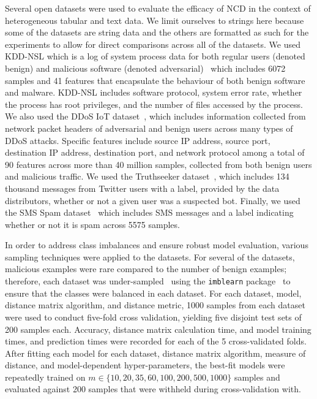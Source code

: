 \documentclass[preprint,12pt]{article}
\begin{document}
Several open datasets were used to evaluate the efficacy of NCD in the context of heterogeneous tabular and text data.
We limit ourselves to strings here because some of the datasets are string data and the others are formatted as such for the experiments to allow for direct comparisons across all of the datasets.
We used KDD-NSL which is a log of system process data for both regular users (denoted benign) and malicious software (denoted adversarial)~\cite{kddnsl} which includes 6072 samples and 41 features that encapsulate the behaviour of both benign software and malware.
KDD-NSL includes software protocol, system error rate, whether the process has root privileges, and the number of files accessed by the process.
We also used the DDoS IoT dataset~\cite{ddos}, which includes information collected from network packet headers of adversarial and benign users across many types of DDoS attacks.
Specific features include source IP address, source port, destination IP address, destination port, and network protocol among a total of 90 features across more than 40 million samples, collected from both benign users and malicious traffic.
We used the Truthseeker dataset~\cite{truthseeker}, which includes 134 thousand messages from Twitter users with a label, provided by the data distributors, whether or not a given user was a suspected bot.
Finally, we used the SMS Spam dataset~\cite{sms_spam} which includes SMS messages and a label indicating whether or not it is spam across 5575 samples.

In order to address class imbalances and ensure robust model evaluation, various sampling techniques were applied to the datasets. 
For several of the datasets, malicious examples were rare compared to the number of benign examples; therefore, each dataset was under-sampled~\cite{undersampling} using the \texttt{imblearn} package~\cite{imblearn} to ensure that the classes were balanced in each dataset. 
For each dataset, model, distance matrix algorithm, and distance metric, 1000 samples from each dataset were used to conduct five-fold cross validation, yielding five disjoint test sets of 200 samples each. 
Accuracy, distance matrix calculation time, and model training times, and prediction times were recorded for each of the 5 cross-validated folds.
After fitting each model for each dataset, distance matrix algorithm, measure of distance, and model-dependent hyper-parameters, the best-fit models were repeatedly trained on $m \in \{ 10, 20, 35, 60, 100, 200, 500, 1000\}$ samples and evaluated against 200 samples that were withheld during cross-validation with.
\end{document}
